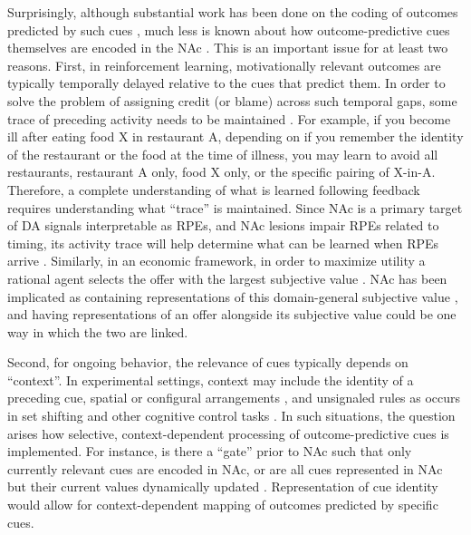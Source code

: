 \documentclass[11pt]{article}
\let\cite=\citep
\begin{document}
Surprisingly, although substantial work has been done on the coding of
outcomes predicted by such cues
\cite{Schultz1992,Hollerman1998,Hassani2001,Cromwell2003,Setlow2003,Nicola2004,Roitman2005,Day2006,Roesch2009a,Saddoris2011,Goldstein2012,Lansink2012,Bissonette2013,McGinty2013,Atallah2014,Sugam2014,Cooch2015,West2016},
much less is known about how outcome-predictive cues themselves are
encoded in the NAc \cite[but see;][]{Sleezer2016}. This is an important issue for
at least two reasons. First, in reinforcement learning, motivationally
relevant outcomes are typically temporally delayed relative to the
cues that predict them. In order to solve the problem of assigning
credit (or blame) across such temporal gaps, some trace of preceding
activity needs to be maintained \cite{sutton1998,Lee2012}. For
example, if you become ill after eating food X in restaurant A,
depending on if you remember the identity of the restaurant or the
food at the time of illness, you may learn to avoid all restaurants,
restaurant A only, food X only, or the specific pairing of
X-in-A. Therefore, a complete understanding of what is learned
following feedback requires understanding what “trace” is
maintained. Since NAc is a primary target of DA signals interpretable
as RPEs, and NAc lesions impair RPEs
related to timing, its activity trace will help determine what can be
learned when RPEs arrive
\cite{Ikemoto2007,McDannald2011,Hart2014,Hamid2016,Takahashi2016}. Similarly, in an economic framework, in order to maximize utility a rational agent selects the offer with the largest subjective value \cite{Samuelson1947}. NAc has been implicated as containing representations of this domain-general subjective value \cite{Peters2009,Levy2012,Bartra2013,Sescousse2015}, and having representations of an offer alongside its subjective value could be one way in which the two are linked.

Second, for ongoing behavior, the relevance of cues typically depends
on “context”. In experimental settings, context may include the
identity of a preceding cue, spatial or configural arrangements
\cite{Holland1992,Bouton1993,Honey2014}, and unsignaled rules as
occurs in set shifting and other cognitive control tasks
\cite{Grant1948,cohen1992context,Floresco2006a,Sleezer2016}. In such
situations, the question arises how selective, context-dependent
processing of outcome-predictive cues is implemented. For instance, is
there a “gate” prior to NAc such that only currently relevant cues are encoded in NAc, or are all cues represented in NAc but
their current values dynamically updated
\cite{Goto2008,Fitzgerald2014,Sleezer2016}. Representation of cue
identity would allow for context-dependent mapping of outcomes
predicted by specific cues.
\end{document}
